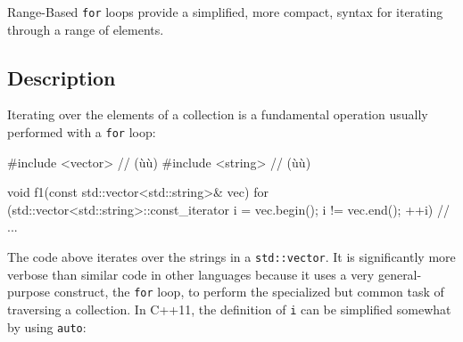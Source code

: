 

\label{range-based-for-loops}
\setcounter{table}{0}
\setcounter{footnote}{0}
\setcounter{lstlisting}{0}

Range-Based \lstinline!for! loops provide a simplified, more compact,
syntax for iterating through a range of elements.

\subsection[Description]{Description}\label{description-rangefor}

Iterating over the elements of a collection is a fundamental operation
usually performed with a \lstinline!for! loop:

\begin{emcppslisting}[emcppsbatch=e1]
#include <vector>  // (ù{}ù)
#include <string>  // (ù{}ù)

void f1(const std::vector<std::string>& vec)
{
    for (std::vector<std::string>::const_iterator i = vec.begin();
         i != vec.end(); ++i)
    {
        // ...
    }
}
\end{emcppslisting}


\noindent The code above iterates over the strings in a \lstinline!std::vector!. It
is significantly more verbose than similar code in other languages
because it uses a very general-purpose construct, the \lstinline!for! loop,
to perform the specialized but common task of traversing a collection.
In C++11, the definition of \lstinline!i! can be simplified somewhat by
using \lstinline!auto!:

